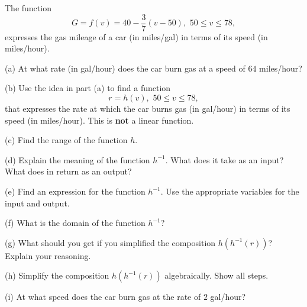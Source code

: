 \documentclass{ximera}
\begin{document}
\begin{example} \label{Ex4:Inverses}
The function 
\[
    G = f(v) = 40-\frac{3}{7}(v-50) ,  \,\, 50\leq v \leq 78 ,
\]
expresses the gas mileage of a car (in miles/gal) in terms of its speed (in miles/hour).

(a) At what rate (in gal/hour) does the car burn gas at a speed of $64$ miles/hour?

(b) Use the idea in part (a) to find a function 
\[
     r=h(v) , \,\, 50\leq v \leq 78 ,
\]
that expresses the rate at which the car burns gas (in gal/hour) in terms of its speed (in miles/hour). This is {\bf not} a linear function.

(c) Find the range of the function $h$.

(d) Explain the meaning of the function $h^{-1}$. What does it take as an input? What does in return as an output?

(e) Find an expression for the function $h^{-1}$. Use the appropriate variables for the input and output.

(f) What is the domain of the function $h^{-1}$?

(g) What should you get if you simplified the composition $h(h^{-1}(r))$? Explain your reasoning.

(h) Simplify the composition $h(h^{-1}(r))$ algebraically. Show all steps.

(i) At what speed does the car burn gas at the rate of $2$ gal/hour?

\end{example}
\end{document}
